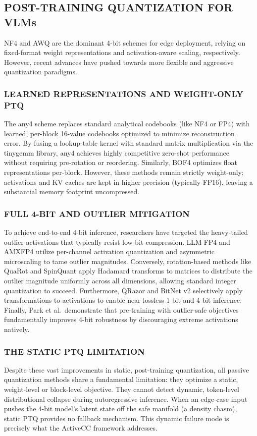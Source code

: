 \documentclass{ieeetmlcn}
\begin{document}
\subsection{POST-TRAINING QUANTIZATION FOR VLMs}
NF4 \cite{dettmers2023qlora} and AWQ \cite{lin2024awq} are the dominant
4-bit schemes for edge deployment, relying on fixed-format weight representations and activation-aware scaling, respectively. However, recent advances have pushed towards more flexible and aggressive quantization paradigms. 

\subsubsection{LEARNED REPRESENTATIONS AND WEIGHT-ONLY PTQ}
The any4 scheme \cite{elhoushi2025any} replaces standard analytical codebooks (like NF4 or FP4) with learned, per-block 16-value codebooks optimized to minimize reconstruction error. By fusing a lookup-table kernel with standard matrix multiplication via the tinygemm library, any4 achieves highly competitive zero-shot performance without requiring pre-rotation or reordering. Similarly, BOF4  optimizes float representations per-block. However, these methods remain strictly weight-only; activations and KV caches are kept in higher precision (typically FP16), leaving a substantial memory footprint uncompressed.

\subsubsection{FULL 4-BIT AND OUTLIER MITIGATION}
To achieve end-to-end 4-bit inference, researchers have targeted the heavy-tailed outlier activations that typically resist low-bit compression. LLM-FP4  and AMXFP4  utilize per-channel activation quantization and asymmetric microscaling to tame outlier magnitudes. Conversely, rotation-based methods like QuaRot  and SpinQuant \cite{liu2025spinquant} apply Hadamard transforms to matrices to distribute the outlier magnitude uniformly across all dimensions, allowing standard integer quantization to succeed. Furthermore, QRazor  and BitNet v2  selectively apply transformations to activations to enable near-lossless 1-bit and 4-bit inference. Finally, Park et al.\  demonstrate that pre-training with outlier-safe objectives fundamentally improves 4-bit robustness by discouraging extreme activations natively.

\subsubsection{THE STATIC PTQ LIMITATION}
Despite these vast improvements in static, post-training quantization, all passive quantization methods share a fundamental limitation: they optimize a static, weight-level or block-level objective. They cannot detect dynamic, token-level distributional collapse during autoregressive inference. When an edge-case input pushes the 4-bit model's latent state off the safe manifold (a density chasm), static PTQ provides no fallback mechanism. This dynamic failure mode is precisely what the ActiveCC framework addresses.
\end{document}
